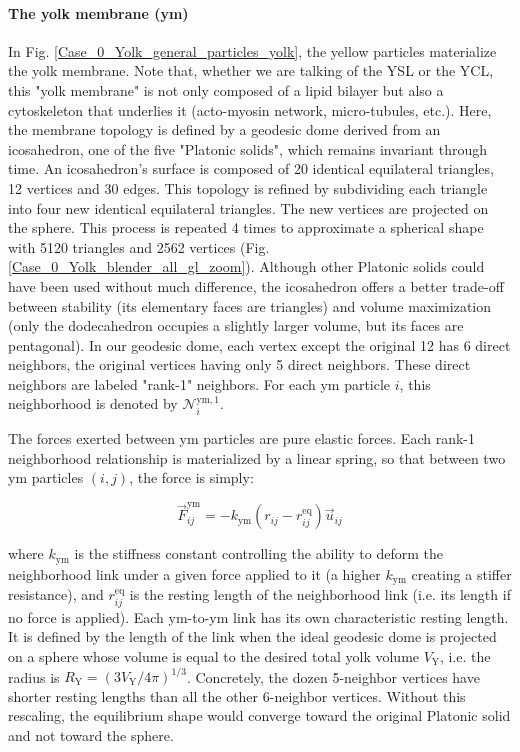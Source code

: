 \paragraph{The yolk membrane (ym)}


In Fig. \ref{Case_0_Yolk_general_particles_yolk}, the yellow particles materialize the yolk membrane. Note that, whether we are talking of the YSL or the YCL, this "yolk membrane" is not only composed of a lipid bilayer but also a cytoskeleton that underlies it (acto-myosin network, micro-tubules, etc.). Here, the membrane topology is defined by a geodesic dome derived from an icosahedron, one of the five "Platonic solids", which remains invariant through time. An icosahedron's surface is composed of 20 identical equilateral triangles, 12 vertices and 30 edges. This topology is refined by subdividing each triangle into four new identical equilateral triangles. The new vertices are projected on the sphere. This process is repeated 4 times to approximate a spherical shape with 5120 triangles and 2562 vertices (Fig. \ref{Case_0_Yolk_blender_all_gl_zoom}). Although other Platonic solids could have been used without much difference, the icosahedron offers a better trade-off between stability (its elementary faces are triangles) and volume maximization (only the dodecahedron occupies a slightly larger volume, but its faces are pentagonal). In our geodesic dome, each vertex except the original 12 has 6 direct neighbors, the original vertices having only 5 direct neighbors. These direct neighbors are labeled "rank-1" neighbors. For each ym particle $i$, this neighborhood is denoted by $\mathcal{N}^{\mathrm{ym},1}_i$.

The forces exerted between ym particles are pure elastic forces. Each rank-1 neighborhood relationship is materialized by a linear spring, so that between two ym particles $(i,j)$, the force is simply:

$$\vec{F}^{\mathrm{ym}}_{ij} = -k_{\mathrm{ym}} (r_{ij} - r^{\mathrm{eq}}_{ij}) \vec{u}_{ij}$$

where $k_{\mathrm{ym}}$ is the stiffness constant controlling the ability to deform the neighborhood link under a given force applied to it (a higher $k_{\mathrm{ym}}$ creating a stiffer resistance), and $r^{\mathrm{eq}}_{ij}$ is the resting length of the neighborhood link (i.e. its length if no force is applied). Each ym-to-ym link has its own characteristic resting length. It is defined by the length of the link when the ideal geodesic dome is projected on a sphere whose volume is equal to the desired total yolk volume $V_{\mathrm{Y}}$, i.e. the radius is $R_{\mathrm{Y}} = (3V_{\mathrm{Y}}/4\pi)^{1/3}$. Concretely, the dozen 5-neighbor vertices have shorter resting lengths than all the other 6-neighbor vertices. Without this rescaling, the equilibrium shape would converge toward the original Platonic solid and not toward the sphere.

